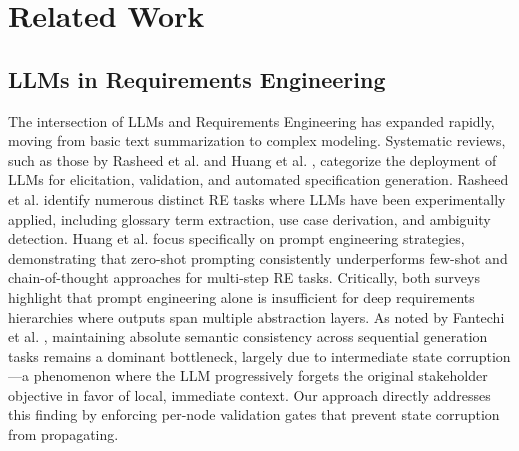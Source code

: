 \documentclass[journal]{IEEEtran}
\begin{document}
\section{Related Work}

\subsection{LLMs in Requirements Engineering}
The intersection of LLMs and Requirements Engineering has expanded rapidly, moving from basic text summarization to complex modeling. Systematic reviews, such as those by Rasheed et al. \cite{llm_re_slr2024} and Huang et al. \cite{prompt_re2025}, categorize the deployment of LLMs for elicitation, validation, and automated specification generation. Rasheed et al. identify numerous distinct RE tasks where LLMs have been experimentally applied, including glossary term extraction, use case derivation, and ambiguity detection. Huang et al. focus specifically on prompt engineering strategies, demonstrating that zero-shot prompting consistently underperforms few-shot and chain-of-thought approaches for multi-step RE tasks. Critically, both surveys highlight that prompt engineering alone is insufficient for deep requirements hierarchies where outputs span multiple abstraction layers. As noted by Fantechi et al. \cite{challenges_llm_re2024}, maintaining absolute semantic consistency across sequential generation tasks remains a dominant bottleneck, largely due to intermediate state corruption---a phenomenon where the LLM progressively forgets the original stakeholder objective in favor of local, immediate context. Our approach directly addresses this finding by enforcing per-node validation gates that prevent state corruption from propagating.
\end{document}
